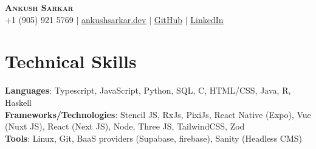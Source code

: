 \documentclass[a4paper,10pt]{article}
\begin{document}

\begin{center}
  \textbf{\Huge \scshape Ankush Sarkar} \\ \vspace{1pt}
  \small +1 (905) 921 5769 $|$ \href{https://www.ankushsarkar.dev/}{\underline{ankushsarkar.dev}} $|$
  \href{https://github.com/AnkushSarkar10}{\underline{GitHub}} $|$
  \href{https://www.linkedin.com/in/ankush-sarkar-a55a5b213/}{\underline{LinkedIn}}
\end{center}

%
\section{Technical Skills}
\begin{itemize}[leftmargin=0.15in, label={}]
  {\item{
                \textbf{Languages}{: Typescript, JavaScript, Python, SQL, C, HTML/CSS, Java, R, Haskell} \\
                \textbf{Frameworks/Technologies}{: Stencil JS, RxJs, PixiJs, React Native (Expo), Vue (Nuxt JS), React (Next JS),  Node, Three JS, TailwindCSS, Zod} \\
                \textbf{Tools}{: Linux, Git, BaaS providers (Supabase, firebase), Sanity (Headless CMS)}
          }}
\end{itemize}


\vspace{-10pt}
\end{document}
